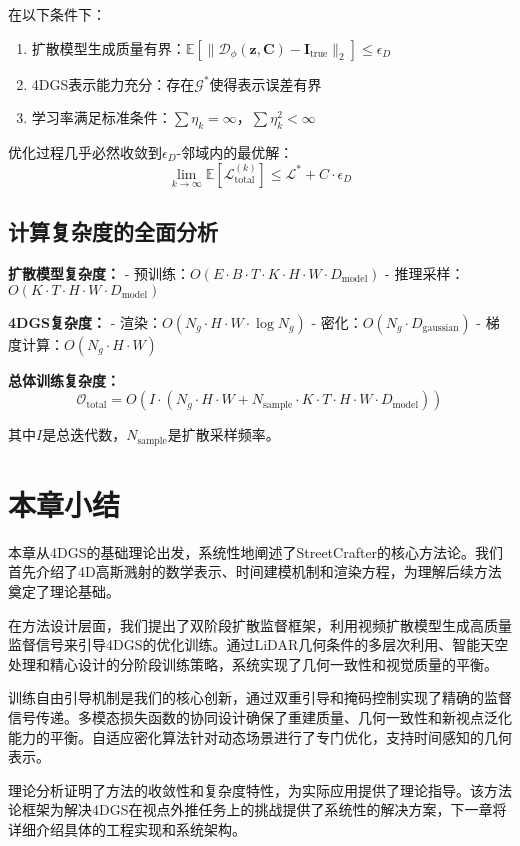 \begin{theorem}[多模态损失收敛性]
在以下条件下：
\begin{enumerate}
\item 扩散模型生成质量有界：$\mathbb{E}[\|\mathcal{D}_\phi(\mathbf{z}, \mathbf{C}) - \mathbf{I}_{\text{true}}\|_2] \leq \epsilon_D$
\item 4DGS表示能力充分：存在$\mathcal{G}^*$使得表示误差有界
\item 学习率满足标准条件：$\sum \eta_k = \infty$，$\sum \eta_k^2 < \infty$
\end{enumerate}
优化过程几乎必然收敛到$\epsilon_D$-邻域内的最优解：
\begin{equation}
\lim_{k \to \infty} \mathbb{E}[\mathcal{L}_{\text{total}}^{(k)}] \leq \mathcal{L}^* + C \cdot \epsilon_D
\end{equation}
\end{theorem}

\subsection{计算复杂度的全面分析}

\textbf{扩散模型复杂度：}
- 预训练：$O(E \cdot B \cdot T \cdot K \cdot H \cdot W \cdot D_{\text{model}})$
- 推理采样：$O(K \cdot T \cdot H \cdot W \cdot D_{\text{model}})$

\textbf{4DGS复杂度：}
- 渲染：$O(N_g \cdot H \cdot W \cdot \log N_g)$
- 密化：$O(N_g \cdot D_{\text{gaussian}})$
- 梯度计算：$O(N_g \cdot H \cdot W)$

\textbf{总体训练复杂度：}
\begin{equation}
\mathcal{O}_{\text{total}} = O(I \cdot (N_g \cdot H \cdot W + N_{\text{sample}} \cdot K \cdot T \cdot H \cdot W \cdot D_{\text{model}}))
\label{eq:total_complexity}
\end{equation}

其中$I$是总迭代数，$N_{\text{sample}}$是扩散采样频率。

\section{本章小结}

本章从4DGS的基础理论出发，系统性地阐述了StreetCrafter的核心方法论。我们首先介绍了4D高斯溅射的数学表示、时间建模机制和渲染方程，为理解后续方法奠定了理论基础。

在方法设计层面，我们提出了双阶段扩散监督框架，利用视频扩散模型生成高质量监督信号来引导4DGS的优化训练。通过LiDAR几何条件的多层次利用、智能天空处理和精心设计的分阶段训练策略，系统实现了几何一致性和视觉质量的平衡。

训练自由引导机制是我们的核心创新，通过双重引导和掩码控制实现了精确的监督信号传递。多模态损失函数的协同设计确保了重建质量、几何一致性和新视点泛化能力的平衡。自适应密化算法针对动态场景进行了专门优化，支持时间感知的几何表示。

理论分析证明了方法的收敛性和复杂度特性，为实际应用提供了理论指导。该方法论框架为解决4DGS在视点外推任务上的挑战提供了系统性的解决方案，下一章将详细介绍具体的工程实现和系统架构。
